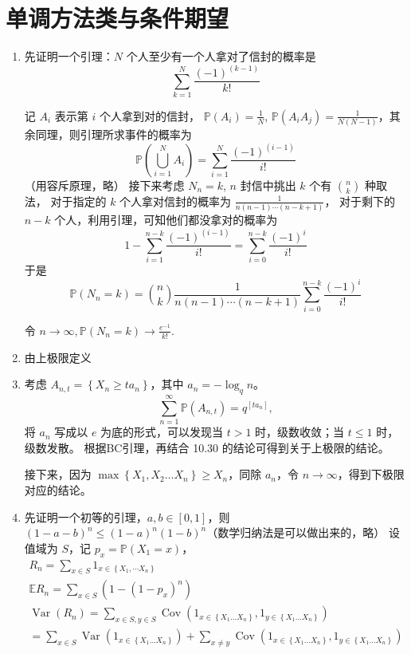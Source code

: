 \section{单调方法类与条件期望}
\begin{enumerate}
\item[28] 先证明一个引理：$N$ 个人至少有一个人拿对了信封的概率是
$$\sum_{k=1}^{N} \frac{(-1)^{(k-1)}}{k!}$$

记 $A_{i}$ 表示第 $i$ 个人拿到对的信封， $\mathbb{P}\left(A_{i}\right)=\frac{1}{N}$, 
$\mathbb{P}\left(A_{i} A_{j}\right)=\frac{1}{N(N-1)}$，其余同理，则引理所求事件的概率为
$$\mathbb{P}\left(\bigcup_{i=1}^{N} A_{i}\right)=\sum_{i=1}^{N} \frac{(-1)^{(i-1)}}{i!}$$
（用容斥原理，略）
接下来考虑 $N_{n}=k$, $n$ 封信中挑出 $k$ 个有 $\binom{n}{k}$ 种取法，
对于指定的 $k$ 个人拿对信封的概率为 $\frac{1}{n(n-1) \cdots(n-k+1)}$，
对于剩下的 $n-k$ 个人，利用引理，可知他们都没拿对的概率为
$$1-\sum_{i=1}^{n-k} \frac{(-1)^{(i-1)}}{i!}=\sum_{i=0}^{n-k} \frac{(-1)^{i}}{i!}$$
于是
$$\mathbb{P}\left(N_{n}=k\right)=\binom{n}{k} \frac{1}{n(n-1) \cdots(n-k+1)} \sum_{i=0}^{n-k} \frac{(-1)^{i}}{i!}$$

令 $n \rightarrow \infty, \mathbb{P}\left(N_{n}=k\right) \rightarrow \frac{e^{-1}}{k!}$.

\item[30] 由上极限定义

\item[31] 考虑 $A_{n, t}=\left\{X_{n} \geq t a_{n}\right\}$，其中 $a_{n}=-\log _{q} n$。
$$\sum_{n=1}^{\infty} \mathbb{P}\left(A_{n, t}\right)=q^{\left[t a_{n}\right]},$$
将 $a_{n}$ 写成以 $e$ 为底的形式，可以发现当 $t>1$ 时，级数收敛；当 $t \leq 1$ 时，级数发散。
根据BC引理，再结合 10.30 的结论可得到关于上极限的结论。

接下来，因为 $\max \left\{X_{1}, X_{2} \ldots X_{n}\right\} \geq X_{n}$，同除 $a_{n}$，令 $n \rightarrow \infty$，得到下极限对应的结论。

\item[40]
先证明一个初等的引理，$a, b \in[0,1]$，则 $(1-a-b)^{n} \leq(1-a)^{n}(1-b)^{n}$（数学归纳法是可以做出来的，略）
设值域为 $S$，记 $p_{x}=\mathbb{P}\left(X_{1}=x\right)$，
$$\begin{gathered}
R_{n}=\sum_{x \in S} 1_{x \in\left\{X_{1}, \cdots X_{n}\right\}} \\
\mathbb{E} R_{n}=\sum_{x \in S}\left(1-\left(1-p_{x}\right)^{n}\right) \\
\operatorname{Var}\left(R_{n}\right)=\sum_{x \in S, y \in S} \operatorname{Cov}\left(1_{x \in\left\{X_{1} \ldots X_{n}\right\}}, 1_{y \in\left\{X_{1} \ldots X_{n}\right\}}\right) \\
=\sum_{x \in S} \operatorname{Var}\left(1_{x \in\left\{X_{1} \ldots X_{n}\right\}}\right)+\sum_{x \neq y} \operatorname{Cov}\left(1_{x \in\left\{X_{1} \ldots X_{n}\right\}}, 1_{y \in\left\{X_{1} \ldots X_{n}\right\}}\right)
\end{gathered}$$


\end{enumerate}

